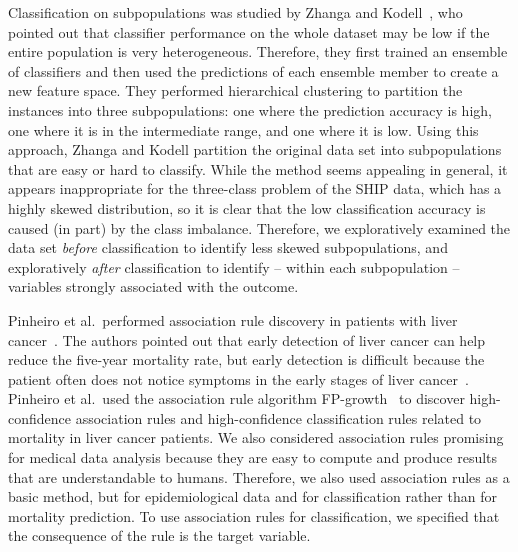 \documentclass[
  oneside]{book}
\begin{document}
Classification on subpopulations was studied by Zhanga and Kodell~\autocite{AIM13}, who pointed out that classifier performance on the whole dataset may be low if the entire population is very heterogeneous.
Therefore, they first trained an ensemble of classifiers and then used the predictions of each ensemble member to create a new feature space.
They performed hierarchical clustering to partition the instances into three subpopulations: one where the prediction accuracy is high, one where it is in the intermediate range, and one where it is low.
Using this approach, Zhanga and Kodell partition the original data set into subpopulations that are easy or hard to classify.
While the method seems appealing in general, it appears inappropriate for the three-class problem of the SHIP data, which has a highly skewed distribution, so it is clear that the low classification accuracy is caused (in part) by the class imbalance.
Therefore, we exploratively examined the data set \emph{before} classification to identify less skewed subpopulations, and exploratively \emph{after} classification to identify -- within each subpopulation -- variables strongly associated with the outcome.

Pinheiro et al.~performed association rule discovery in patients with liver cancer~\autocite{PinheiroEtAl:ICCABS13}.
The authors pointed out that early detection of liver cancer can help reduce the five-year mortality rate, but early detection is difficult because the patient often does not notice symptoms in the early stages of liver cancer~\autocite{PinheiroEtAl:ICCABS13}.
Pinheiro et al.~used the association rule algorithm FP-growth~\autocite{Han:FPGrowth00} to discover high-confidence association rules and high-confidence classification rules related to mortality in liver cancer patients.
We also considered association rules promising for medical data analysis because they are easy to compute and produce results that are understandable to humans.
Therefore, we also used association rules as a basic method, but for epidemiological data and for classification rather than for mortality prediction.
To use association rules for classification, we specified that the consequence of the rule is the target variable.
\end{document}
